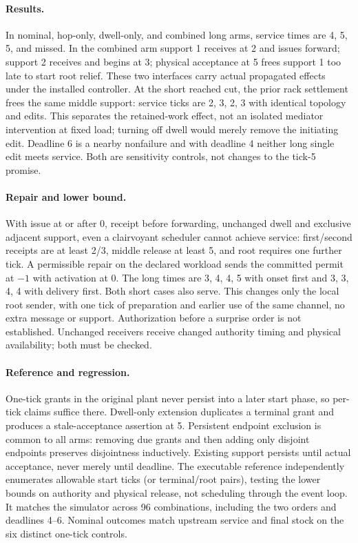 \documentclass{article}
\begin{document}
\paragraph{Results.} In nominal, hop-only, dwell-only, and combined long arms, service times are 4, 5, 5, and missed. In the combined arm support 1 receives at 2 and issues forward; support 2 receives and begins at 3; physical acceptance at 5 frees support 1 too late to start root relief. These two interfaces carry actual propagated effects under the installed controller. At the short reached cut, the prior rack settlement frees the same middle support: service ticks are 2, 3, 2, 3 with identical topology and edits. This separates the retained-work effect, not an isolated mediator intervention at fixed load; turning off dwell would merely remove the initiating edit. Deadline 6 is a nearby nonfailure and with deadline 4 neither long single edit meets service. Both are sensitivity controls, not changes to the tick-5 promise.

\paragraph{Repair and lower bound.} With issue at or after 0, receipt before forwarding, unchanged dwell and exclusive adjacent support, even a clairvoyant scheduler cannot achieve service: first/second receipts are at least 2/3, middle release at least 5, and root requires one further tick. A permissible repair on the declared workload sends the committed permit at $-1$ with activation at 0. The long times are 3, 4, 4, 5 with onset first and 3, 3, 4, 4 with delivery first. Both short cases also serve. This changes only the local root sender, with one tick of preparation and earlier use of the same channel, no extra message or support. Authorization before a surprise order is not established. Unchanged receivers receive changed authority timing and physical availability; both must be checked.

\paragraph{Reference and regression.} One-tick grants in the original plant never persist into a later start phase, so per-tick claims suffice there. Dwell-only extension duplicates a terminal grant and produces a stale-acceptance assertion at 5. Persistent endpoint exclusion is common to all arms: removing due grants and then adding only disjoint endpoints preserves disjointness inductively. Existing support persists until actual acceptance, never merely until deadline. The executable reference independently enumerates allowable start ticks (or terminal/root pairs), testing the lower bounds on authority and physical release, not scheduling through the event loop. It matches the simulator across 96 combinations, including the two orders and deadlines 4--6. Nominal outcomes match upstream service and final stock on the six distinct one-tick controls.
\end{document}
